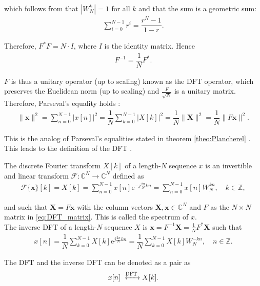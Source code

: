 which follows from that $|W_N^k| = 1$ for all $k$ and that the sum is a geometric sum:
\begin{align*}
\sum_{i=0}^{N-1} r^i = \dfrac{r^N-1}{1-r}.
\end{align*}

Therefore, $F^*F = N \cdot I$, where $I$ is the identity matrix. Hence
\begin{align*}
F^{-1} = \dfrac{1}{N} F^*.
\end{align*}

$F$ is thus a unitary operator (up to scaling) known as the DFT operator, which preserves the Euclidean norm (up to scaling) and $\frac{F}{\sqrt{N}}$ is a unitary matrix. Therefore, Parseval's equality holds \cite{page 258, FSP}:
\begin{align*}
\|\textbf{x}\|^2 = \sum_{n=0}^{N-1} |x[n]|^2 = \dfrac{1}{N} \sum_{k=0}^{N-1} |X[k]|^2 = \dfrac{1}{N} \|\textbf{X}\|^2 = \dfrac{1}{N} \|F\textbf{x}\|^2.
\end{align*}

This is the analog of Parseval's equalities stated in theorem \ref{theo:Plancherel} \cite{page 371, FSP}. This leads to the definition of the DFT \cite{page 253, FSP}.

\begin{definition}
The discrete Fourier transform $X[k]$ of a length-$N$ sequence $x$ is an invertible and linear transform $\mathcal{F}: \mathbb{C}^N \to \mathbb{C}^N$ defined as
\begin{align} \label{eq:def_DFT}
\mathcal{F}\{\textbf{x}\}[k] = X[k] = \sum_{n=0}^{N-1} x[n] \text{e}^{-j\frac{2 \pi}{N}kn} = \sum_{n=0}^{N-1} x[n] W_N^{kn}, \quad k \in \mathbb{Z},
\end{align}

and such that $\textbf{X} = F\textbf{x}$ with the column vectors $\textbf{X}, \textbf{x} \in \mathbb{C}^N$ and $F$ as the $N\times N$ matrix in \eqref{eq:DFT_matrix}. This is called the spectrum of $x$. \\
The inverse DFT of a length-$N$ sequence $X$ is $\textbf{x} = F^{-1} \textbf{X} = \frac{1}{N} F^* \textbf{X}$ such that
\begin{align*}
x[n] = \dfrac{1}{N}\sum_{k=0}^{N-1} X[k] \text{e}^{j\frac{2 \pi}{N}kn} = \dfrac{1}{N}\sum_{k=0}^{N-1} X[k] W_N^{-kn}, \quad n \in \mathbb{Z}.
\end{align*}

The DFT and the inverse DFT can be denoted as a pair as
\begin{align*}
x[n] \xleftrightarrow{\text{DFT}} X[k].
\end{align*}
\end{definition}

